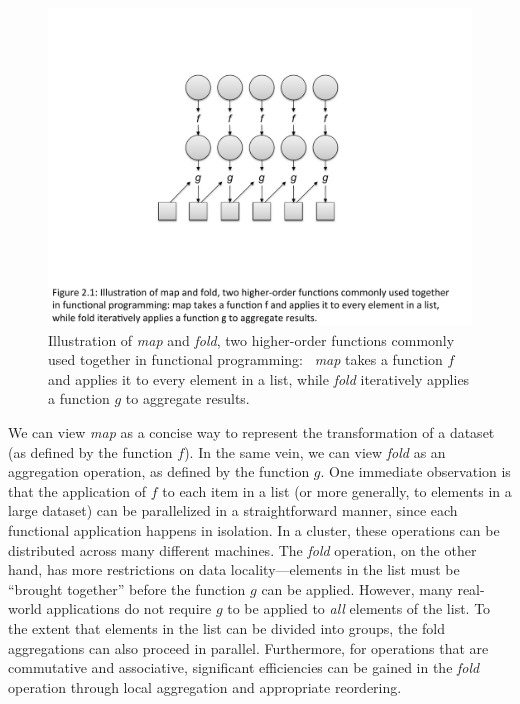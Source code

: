\begin{figure}[t]
\begin{center}
\includegraphics[scale=0.6]{figures/fig-ch2-functional-programming.pdf}
\end{center}
\caption{Illustration of \emph{map} and \emph{fold}, two higher-order
  functions commonly used together in functional programming:\ \emph{
    map} takes a function $f$ and applies it to every element in a
    list, while \emph{fold} iteratively applies a function $g$ to
    aggregate results.}
\label{figure:chapter2:functional}
\end{figure}

We can view \emph{map} as a concise way to represent the transformation
of a dataset (as defined by the function $f$).  In the same vein, we
can view \emph{fold} as an aggregation operation, as defined by the
function $g$.  One immediate observation is that the application of
$f$ to each item in a list (or more generally, to elements in a large
dataset) can be parallelized in a straightforward manner, since each
functional application happens in isolation.  In a cluster, these
operations can be distributed across many different machines.  The
\emph{fold} operation, on the other hand, has more restrictions on data
locality---elements in the list must be ``brought together'' before
the function $g$ can be applied.  However, many real-world
applications do not require $g$ to be applied to \emph{all} elements of
the list.  To the extent that elements in the list can be divided into
groups, the fold aggregations can also proceed in parallel.
Furthermore, for operations that are commutative and associative,
significant efficiencies can be gained in the \emph{fold} operation
through local aggregation and appropriate reordering.

